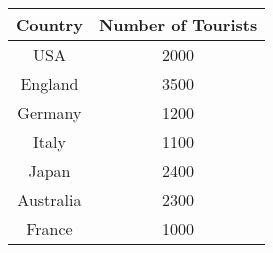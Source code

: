 \begin{center}
\begin{tabular}{|c|c|}
\hline
Country & Number of Tourists \\
\hline
USA & 2000 \\
England & 3500 \\
Germany & 1200 \\
Italy & 1100 \\
Japan & 2400 \\
Australia & 2300 \\
France & 1000 \\
\hline
\end{tabular}
\end{center}

